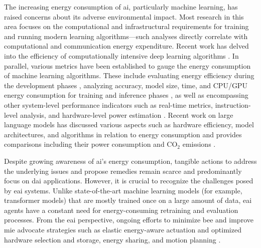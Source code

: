 \documentclass[12pt]{article}
\begin{document}
The increasing energy consumption of \ac{ai}, particularly machine learning, has raised concerns about its adverse environmental impact. Most research in this area focuses on the computational and infrastructural requirements for training and running modern learning algorithms---such analyses directly correlate with computational and communication energy expenditure. Recent work has delved into the efficiency of computationally intensive deep learning algorithms \cite{Schwartz2019GreenAI,Vinuesa2020roleartificialintelligence,Strubell2019EnergyPolicyConsiderations,Luccioni2023EstimatingCarbonFootprint}. In parallel, various metrics have been established to gauge the energy consumption of machine learning algorithms. These include evaluating energy efficiency during the development phases \cite{Zhou2020HULKEnergyEfficiency}, analyzing accuracy, model size, time, and CPU/GPU energy consumption for training and inference phases \cite{Dalgren2019GreenMLmethodology}, as well as encompassing other system-level performance indicators such as real-time metrics, instruction-level analysis, and hardware-level power estimation \cite{GarciaMartin2019Estimationenergyconsumption}. Recent work on large language models has discussed various aspects such as hardware efficiency, model architectures, and algorithms in relation to energy consumption \cite{Vries2023growingenergyfootprint} and provides comparisons including their power consumption and CO$_2$ emissions \cite{SIHCAI2023ArtificialIntelligenceIndex}.

Despite growing awareness of \ac{ai}'s energy consumption, tangible actions to address the underlying issues and propose remedies remain scarce and predominantly focus on \ac{dai} applications. However, it is crucial to recognize the challenges posed by \ac{eai} systems. Unlike state-of-the-art machine learning models (for example, transformer models) that are mostly trained once on a large amount of data, \ac{eai} agents have a constant need for energy-consuming retraining and evaluation processes. From the \ac{eai} perspective, ongoing efforts to minimize \ac{bee} and improve \ac{mie} advocate strategies such as elastic energy-aware actuation and optimized hardware selection and storage, energy sharing, and motion planning \cite{CUT2015Smoothrobotmovements, Mohammed2014MinimizingEnergyConsumption, Chemnitz2011Analyzingenergyconsumption,Vasarhelyi2023OverviewEnergiesProblems,Sekala2024SelectedIssuesMethods}.
\end{document}
